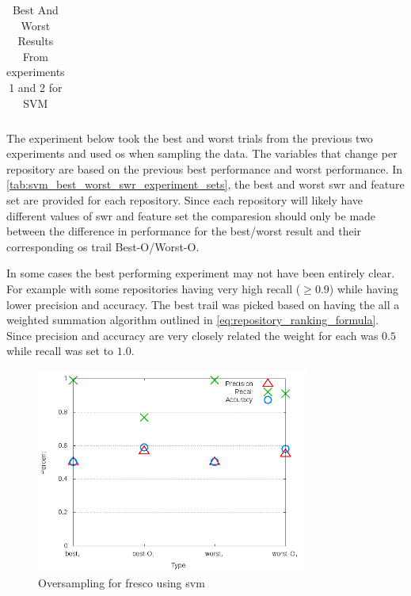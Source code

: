 \begin{table}[ht]
\begin{center}
\begin{tabular}{|c|c|c|c|c|}

        \hline
    \end{tabular}
    \caption{Best And Worst Results From experiments 1 and 2 for SVM}
    \label{tab:svm_best_worst_swr_experiment_sets}
\end{center}
\end{table}

The experiment below took the best and worst trials from the previous two experiments and used \gls{os} when sampling the data. The variables that change per repository are based on the previous best performance and worst performance. In \autoref{tab:svm_best_worst_swr_experiment_sets}, the best and worst \gls{swr} and feature set are provided for each repository. Since each repository will likely have different values of \gls{swr} and feature set the comparesion should only be made between the difference in performance for the best/worst result and their corresponding \gls{os} trail Best-O/Worst-O.

In some cases the best performing experiment may not have been entirely clear. For example with some repositories having very high recall ($ \geq 0.9$) while having lower precision and accuracy. The best trail was picked based on having the all a weighted summation algorithm outlined in \autoref{eq:repository_ranking_formula}. Since precision and accuracy are very closely related the weight for each was $0.5$ while recall was set to $1.0$.


\begin{figure}[!t]
    \centering
        \includegraphics[width=0.8\textwidth]{images/svm/test_4/fresco_sample_range}
        \caption{Oversampling for fresco using \gls{svm}}
        \label{fig:test_4_fresco_svm}
\end{figure}


